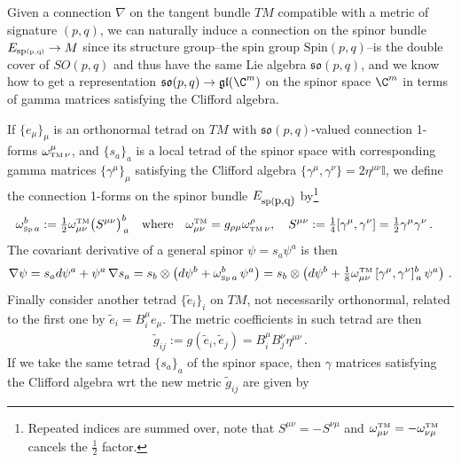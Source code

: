 \begin{mytheorem}
%
Given a connection $\nabla$ on the tangent bundle $TM$ compatible with a metric of signature $(p,q)$,  we can naturally induce a connection on the spinor bundle $E_{\text{sp\tiny(p,q)}}\to M$ since its structure group--the spin group $\text{Spin}(p,q)$--is the double cover of $SO(p,q)$ and thus have the same Lie algebra $\mathfrak{so}(p,q)$, and we know how to get a representation $\mathfrak{so}(p,q) \to \mathfrak{gl}(\C^m)$ on the spinor space $\C^m$ in terms of gamma matrices satisfying the Clifford algebra.
\smallskip

If $\{e_{\mu}\}_\mu$ is an orthonormal tetrad on $TM$ with $\mathfrak{so}(p,q)$-valued connection 1-forms $\omega^{\mu}_{{\text{\tiny TM}}\,\nu}$, and $\{s_a\}_a$ is a local tetrad of the spinor space with corresponding gamma matrices $\{\gamma^\mu\}_\mu$ satisfying the Clifford algebra $\{\gamma^\mu, \gamma^\nu\} = 2 \eta^{\mu\nu} \mathbb{I}$, we define the connection 1-forms on the spinor bundle $E_{\text{sp(\small p,q)}}$ by\footnote{Repeated indices are summed over, note that $S^{\mu\nu}=-S^{\nu\mu}$ and $\omega^{\text{\tiny TM}}_{\mu\nu}=-\omega^{\text{\tiny TM}}_{\nu\mu}$ cancels the $\tfrac12$ factor.}
\begin{align}
    \omega^{b}_{{\text{\tiny Sp}}\, a}&:= \tfrac12 \omega^{\text{\tiny TM}}_{\mu\nu} \big(S^{\mu\nu}\big)^b_{\,a} \quad \text{where}\quad \omega^{\text{\tiny TM}}_{\mu\nu}= g_{\rho\mu} \omega^\rho_{{\text{\tiny TM}}\, \nu}, \quad S^{\mu\nu} := \tfrac{1}{4} [\gamma^\mu, \gamma^\nu] = \tfrac12 \gamma^\mu\gamma^\nu\,.
\end{align}
The covariant derivative of a general spinor $\psi = s_a \psi^a$ is then
\begin{equation}
    \nabla \psi =  s_a d\psi^a + \psi^a \, \nabla s_a = s_b\otimes \left( d \psi^b + \omega^b_{\text{\tiny Sp}\, a} \, \psi^a \right)=
     s_b\otimes \left( d \psi^b + \tfrac{1}{8} \omega^{\text{\tiny TM}}_{\mu\nu}\, [\gamma^\mu, \gamma^\nu]^b_{\,a} \, \psi^a \right)\,.
\end{equation}
%
Finally consider another tetrad $\{\tilde{e}_i\}_i$ on $TM$, not necessarily orthonormal, related to the first one by $\tilde{e}_i= B_i^\mu e_\mu$.
The metric coefficients in such tetrad are then
\begin{align}
    \tilde{g}_{ij}:=g(\tilde{e}_i,\tilde{e}_j) = B_i^\mu B_j^\nu \eta^{\mu\nu}\,.
\end{align}
If we take the same tetrad $\{s_a\}_a$ of the spinor space, then $\gamma$ matrices satisfying the Clifford algebra wrt the new metric $\tilde{g}_{ij}$ are given by

\end{mytheorem}
